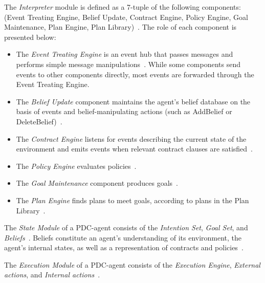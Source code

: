 \begin{definition}
    The \textit{Interpreter} module is defined as a 7-tuple of the following components: (Event Treating Engine, Belief Update, Contract Engine, Policy Engine, Goal Maintenance, Plan Engine, Plan Library)~\citep{liao_extended_2006}.
    The role of each component is presented below:

    \begin{itemize}
        \item The \textit{Event Treating Engine} is an event hub that passes messages and performs simple message manipulations~\citep{liao_extended_2006}.
            While some components send events to other components directly, most events are forwarded through the Event Treating Engine.
        \item The \textit{Belief Update} component maintains the agent's belief database on the basis of events and belief-manipulating actions (such as AddBelief or DeleteBelief)~\citep{liao_extended_2006}.
        \item The \textit{Contract Engine} listens for events describing the current state of the environment and emits events when relevant contract clauses are satisfied~\citep{liao_extended_2006}.
        \item The \textit{Policy Engine} evaluates policies~\citep{liao_extended_2006}.
        \item The \textit{Goal Maintenance} component produces goals~\citep{liao_extended_2006}.
        \item The \textit{Plan Engine} finds plans to meet goals, according to plans in the Plan Library~\citep{liao_extended_2006}.
    \end{itemize}
\end{definition}

\begin{definition}
    The \textit{State Module} of a PDC-agent consists of the \textit{Intention Set}, \textit{Goal Set}, and \textit{Beliefs}~\citep{liao_extended_2006}.
    Beliefs constitute an agent's understanding of its environment, the agent's internal states, as well as a representation of contracts and policies~\citep{liao_extended_2006}.
\end{definition}

\begin{definition}
    The \textit{Execution Module} of a PDC-agent consists of the \textit{Execution Engine}, \textit{External actions}, and \textit{Internal actions}~\citep{liao_extended_2006}.
\end{definition}

